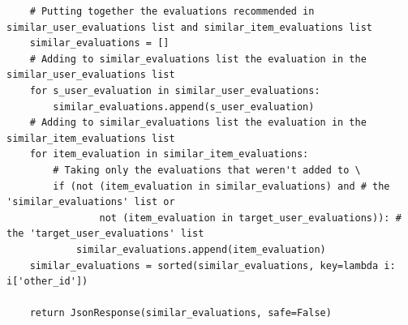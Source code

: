 \begin{lstlisting}
	# Putting together the evaluations recommended in similar_user_evaluations list and similar_item_evaluations list
	similar_evaluations = []
	# Adding to similar_evaluations list the evaluation in the similar_user_evaluations list
	for s_user_evaluation in similar_user_evaluations:
		similar_evaluations.append(s_user_evaluation)
	# Adding to similar_evaluations list the evaluation in the similar_item_evaluations list
	for item_evaluation in similar_item_evaluations:
		# Taking only the evaluations that weren't added to \
		if (not (item_evaluation in similar_evaluations) and # the 'similar_evaluations' list or
				not (item_evaluation in target_user_evaluations)): # the 'target_user_evaluations' list
			similar_evaluations.append(item_evaluation)
	similar_evaluations = sorted(similar_evaluations, key=lambda i: i['other_id'])

	return JsonResponse(similar_evaluations, safe=False)
\end{lstlisting}

